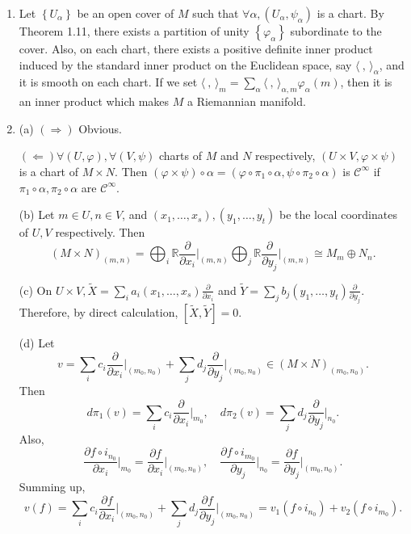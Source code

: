 \begin{enumerate}
Therefore, by Theorem 1.48(c), $\gamma$ should be a constant map.
\item Let $\left\{U_{\alpha}\right\}$ be an open cover of $M$ such that $\forall \alpha,\left(U_{\alpha}, \psi_{\alpha}\right)$ is a chart. 
By Theorem 1.11, there exists a partition of unity $\left\{\varphi_{\alpha}\right\}$ subordinate to the cover. 
Also, on each chart, there exists a positive definite inner product induced by the standard inner product on the Euclidean space, say $\langle\ ,\,\rangle_{\alpha}$, and it is smooth on each chart. 
If we set $\langle\ ,\,\rangle_{m}=\sum_{\alpha}\langle\ ,\,\rangle_{\alpha, m} \varphi_{\alpha}(m)$, 
then it is an inner product which makes $M$ a Riemannian manifold.
\item (a) $(\Rightarrow)$ Obvious.

$(\Leftarrow) \forall(U, \varphi), \forall(V, \psi)$ charts of $M$ and $N$ respectively, $(U \times V, \varphi \times \psi)$ is a chart of $M \times N$. 
Then $(\varphi \times \psi) \circ \alpha=\left(\varphi \circ \pi_{1} \circ \alpha, \psi \circ \pi_{2} \circ \alpha\right)$ is $\mathcal{C}^{\infty}$ 
if $\pi_{1} \circ \alpha, \pi_{2} \circ \alpha$ are $\mathcal{C}^{\infty}$.

(b) Let $m \in U, n \in V$, and $(x_{1}, \ldots, x_{s}),(y_{1}, \ldots, y_{t})$ be the local coordinates of $U, V$ respectively. Then
\[(M \times N)_{(m, n)}=\bigoplus_{i} \mathbb{R} \frac{\partial}{\partial x_{i}}\Big|_{(m, n)} \bigoplus_{j} \mathbb{R} \frac{\partial}{\partial y_{j}}\Big|_{(m, n)} \cong M_{m} \oplus N_{n}.\]

(c) On $U \times V, \tilde{X}=\sum_{i} a_{i}(x_{1}, \ldots, x_{s}) \frac{\partial}{\partial x_{i}}$ and $\tilde{Y}=\sum_{j} b_{j}(y_{1}, \ldots, y_{t}) \frac{\partial}{\partial y_{j}}$. 
Therefore, by direct calculation, $[\tilde{X}, \tilde{Y}]=0$.

(d) Let
\[v=\sum_{i} c_{i} \frac{\partial}{\partial x_{i}}\bigg|_{(m_{0}, n_{0})}
+\sum_{j} d_{j} \frac{\partial}{\partial y_{j}}\bigg|_{(m_{0}, n_{0})} \in(M \times N)_{\left(m_{0}, n_{0}\right)}.\]
Then \[d \pi_{1}(v)=\sum_{i} c_{i} \frac{\partial}{\partial x_{i}}\bigg|_{m_{0}},
\quad d \pi_{2}(v)=\sum_{j} d_{j} \frac{\partial}{\partial y_{j}}\bigg|_{n_{0}}.\]
Also, \[\frac{\partial f \circ i_{n_{0}}}{\partial x_{i}}\bigg|_{m_{0}}
=\frac{\partial f}{\partial x_{i}}\bigg|_{(m_{0}, n_{0})},
\quad \frac{\partial f \circ i_{m_{0}}}{\partial y_{j}}\bigg|_{n_{0}}
=\frac{\partial f}{\partial y_{j}}\bigg|_{(m_{0}, n_{0})}.\]
Summing up,
\[v(f)=\sum_{i} c_{i} \frac{\partial f}{\partial x_{i}}\bigg|_{(m_{0}, n_{0})}
+\sum_{j} d_{j} \frac{\partial f}{\partial y_{j}}\bigg|_{(m_{0}, n_{0})}
=v_{1}(f \circ i_{n_{0}})+v_{2}(f \circ i_{m_{0}}).\]
\end{enumerate}